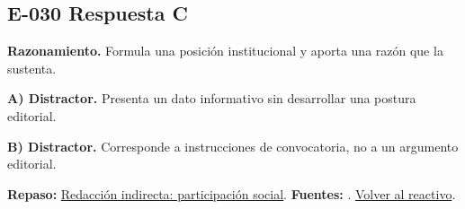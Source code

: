 \subsection*{E-030 \quad Respuesta C}\label{s:E-030}
\textbf{Razonamiento.} Formula una posición institucional y aporta una razón que la sustenta.

\textbf{A) Distractor. }Presenta un dato informativo sin desarrollar una postura editorial.

\textbf{B) Distractor. }Corresponde a instrucciones de convocatoria, no a un argumento editorial.

\textbf{Repaso:} \hyperref[sec:e2]{Redacción indirecta: participación social}. \textbf{Fuentes:} \cite{rae,writing}. \hyperref[q:E-030]{Volver al reactivo}.\par\medskip